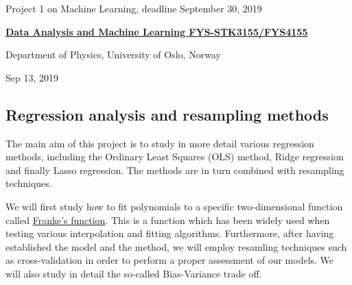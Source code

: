 \documentclass[%
oneside,                 %
final,                   %
10pt]{article}
\begin{document}

\newcommand{\exercisesection}[1]{\subsection*{#1}}






\thispagestyle{empty}

\begin{center}
{\LARGE\bf
\begin{spacing}{1.25}
Project 1 on Machine Learning, deadline September 30, 2019
\end{spacing}
}
\end{center}


\begin{center}
{\bf \href{{http://www.uio.no/studier/emner/matnat/fys/FYS3155/index-eng.html}}{Data Analysis and Machine Learning FYS-STK3155/FYS4155}}
\end{center}

    \begin{center}
\centerline{{\small Department of Physics, University of Oslo, Norway}}
\end{center}
    

\begin{center}
Sep 13, 2019
\end{center}

\vspace{1cm}


\subsection*{Regression analysis and resampling methods}

The main aim of this project is to study in more detail various
regression methods, including the Ordinary Least Squares (OLS) method,
Ridge regression and finally Lasso regression.
The methods are in turn combined with resampling techniques.

We will first study how to fit polynomials to a specific
two-dimensional function called \href{{http://www.dtic.mil/dtic/tr/fulltext/u2/a081688.pdf}}{Franke's
function}.  This
is a function which has been widely used when testing various
interpolation and fitting algorithms. Furthermore, after having
established the model and the method, we will employ resamling
techniques such as cross-validation in order to perform a
proper assessment of our models. We will also study in detail the
so-called Bias-Variance trade off.
\end{document}
